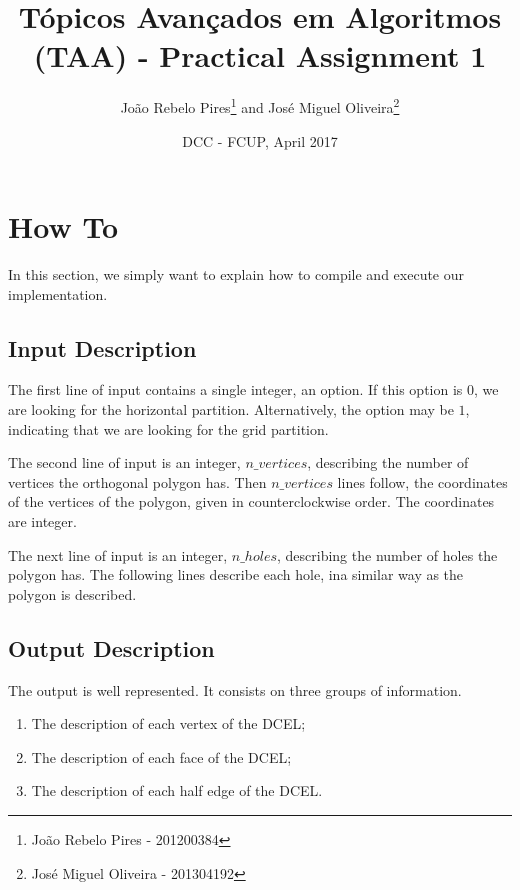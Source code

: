 \documentclass[12pt,a4paper,oneside]{article}
\title{Tópicos Avançados em Algoritmos (TAA) - Practical Assignment 1}
\author{João Rebelo Pires\footnote{João Rebelo Pires - 201200384} and José Miguel Oliveira\footnote{José Miguel Oliveira - 201304192}}
\date{DCC - FCUP, April 2017}
\begin{document}
\maketitle


\section{How To}\label{sec:for_dummies}

In this section, we simply want to explain how to compile and execute our implementation.

\subsection{Input Description}\label{subsec:input_descrip}

The first line of input contains a single integer, an option. If this option is $0$, we are looking for the horizontal partition. Alternatively, the option may be $1$, indicating that we are looking for the grid partition.

The second line of input is an integer, $n\_vertices$, describing the number of vertices the orthogonal polygon has. Then $n\_vertices$ lines follow, the coordinates of the vertices of the polygon, given in counterclockwise order. The coordinates are integer.

The next line of input is an integer, $n\_holes$, describing the number of holes the polygon has. The following lines describe each hole, ina  similar way as the polygon is described.

\subsection{Output Description}\label{subsec:output_descrip}

The output is well represented. It consists on three groups of information.

\begin{enumerate}
	\item The description of each vertex of the DCEL;
	\item The description of each face of the DCEL;
	\item The description of each half edge of the DCEL.
\end{enumerate}
\end{document}
